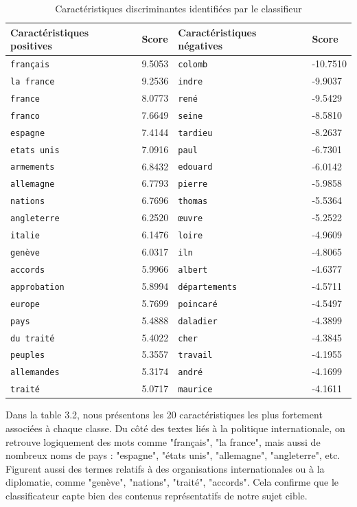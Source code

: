 \documentclass[a4paper,twoside,12pt]{book}
\begin{document}
\begin{table}[ht]
\centering
\begin{tabular}{ll@{\hskip 1cm}ll}
\textbf{Caractéristiques positives} & \textbf{Score} & \textbf{Caractéristiques négatives} & \textbf{Score} \\
\hline
\texttt{français} & 9.5053 & \texttt{colomb} & -10.7510 \\
\texttt{la france} & 9.2536 & \texttt{indre} & -9.9037 \\
\texttt{france} & 8.0773 & \texttt{rené} & -9.5429 \\
\texttt{franco} & 7.6649 & \texttt{seine} & -8.5810 \\
\texttt{espagne} & 7.4144 & \texttt{tardieu} & -8.2637 \\
\texttt{etats unis} & 7.0916 & \texttt{paul} & -6.7301 \\
\texttt{armements} & 6.8432 & \texttt{edouard} & -6.0142 \\
\texttt{allemagne} & 6.7793 & \texttt{pierre} & -5.9858 \\
\texttt{nations} & 6.7696 & \texttt{thomas} & -5.5364 \\
\texttt{angleterre} & 6.2520 & \texttt{œuvre} & -5.2522 \\
\texttt{italie} & 6.1476 & \texttt{loire} & -4.9609 \\
\texttt{genève} & 6.0317 & \texttt{iln} & -4.8065 \\
\texttt{accords} & 5.9966 & \texttt{albert} & -4.6377 \\
\texttt{approbation} & 5.8994 & \texttt{départements} & -4.5711 \\
\texttt{europe} & 5.7699 & \texttt{poincaré} & -4.5497 \\
\texttt{pays} & 5.4888 & \texttt{daladier} & -4.3899 \\
\texttt{du traité} & 5.4022 & \texttt{cher} & -4.3845 \\
\texttt{peuples} & 5.3557 & \texttt{travail} & -4.1955 \\
\texttt{allemandes} & 5.3174 & \texttt{andré} & -4.1699 \\
\texttt{traité} & 5.0717 & \texttt{maurice} & -4.1611 \\
\end{tabular}
\caption{Caractéristiques discriminantes identifiées par le classifieur}
\label{tab:features_table}
\end{table}

Dans la table 3.2, nous présentons les 20 caractéristiques les plus fortement associées à chaque classe. Du côté des textes liés à la politique internationale, on retrouve logiquement des mots comme "français", "la france", mais aussi de nombreux noms de pays : "espagne", "états unis", "allemagne", "angleterre", etc. Figurent aussi des termes relatifs à des organisations internationales ou à la diplomatie, comme "genève", "nations", "traité", "accords". Cela confirme que le classificateur capte bien des contenus représentatifs de notre sujet cible.
\end{document}
